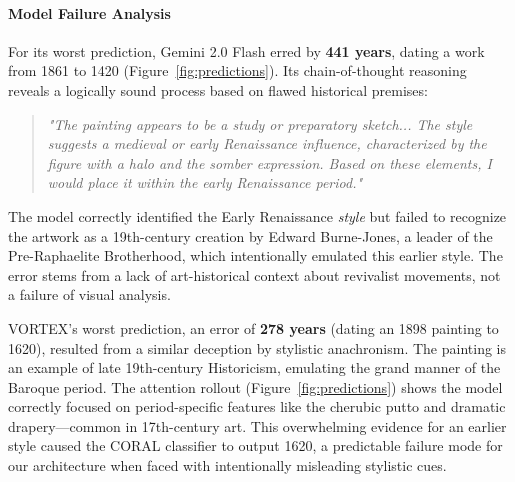 \documentclass[10pt,twocolumn,letterpaper]{article}
\begin{document}
\paragraph{Model Failure Analysis}
For its worst prediction, Gemini 2.0 Flash erred by \textbf{441 years}, dating a work from 1861 to 1420 (Figure~\ref{fig:predictions}). Its chain-of-thought reasoning reveals a logically sound process based on flawed historical premises:
\begin{quote}
    \textit{"The painting appears to be a study or preparatory sketch... The style suggests a medieval or early Renaissance influence, characterized by the figure with a halo and the somber expression. Based on these elements, I would place it within the early Renaissance period."}
\end{quote}
The model correctly identified the Early Renaissance \textit{style} but failed to recognize the artwork as a 19th-century creation by Edward Burne-Jones, a leader of the Pre-Raphaelite Brotherhood, which intentionally emulated this earlier style. The error stems from a lack of art-historical context about revivalist movements, not a failure of visual analysis.

VORTEX's worst prediction, an error of \textbf{278 years} (dating an 1898 painting to 1620), resulted from a similar deception by stylistic anachronism. The painting is an example of late 19th-century Historicism, emulating the grand manner of the Baroque period. The attention rollout (Figure~\ref{fig:predictions}) shows the model correctly focused on period-specific features like the cherubic putto and dramatic drapery—common in 17th-century art. This overwhelming evidence for an earlier style caused the CORAL classifier to output 1620, a predictable failure mode for our architecture when faced with intentionally misleading stylistic cues.

\end{document}
